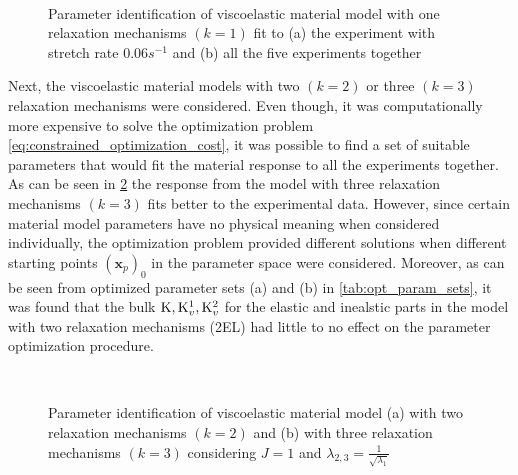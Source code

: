 \begin{figure}[htpb]
    \centering
     \label{fig:parameter_optimization_1EL_pt06} 
     \label{fig:parameter_optimization_1EL_all}\\
    \caption[Parameter identification 1]{Parameter identification of viscoelastic material model with one relaxation mechanisms \((k=1)\) fit to (a) the experiment with stretch rate \(0.06s^{-1}\) and (b) all the five experiments together}
    \label{fig:parameter_optimization_1EL}
\end{figure}

Next, the viscoelastic material models with two \((k=2)\) or three \((k=3)\) relaxation mechanisms were considered. Even though, it was computationally more expensive to solve the optimization problem \cref{eq:constrained_optimization_cost}, it was possible to find a set of suitable parameters that would fit the material response to all the experiments together. As can be seen in \cref{fig:parameter_optimization} the response from the model with three relaxation mechanisms \((k=3)\) fits better to the experimental data. However, since certain material model parameters have no physical meaning when considered individually, the optimization problem provided different solutions when different starting points \((\bm{x}_{p})_{0}\) in the parameter space were considered. Moreover, as can be seen from  optimized parameter sets (a) and (b) in \cref{tab:opt_param_sets}, it was found that the bulk  \(\mathrm{K}{}, \mathrm{K}_{v}^{1}, \mathrm{K}_{v}^{2}\) for the elastic and inealstic parts in the model with two relaxation mechanisms (2EL) had little to no effect on the parameter optimization procedure. 


\begin{figure}[htpb]
    \centering
     \label{fig:parameter_optimization_2EL} 
     \label{fig:parameter_optimization_3EL}\\
    \caption[Parameter identification 2]{Parameter identification of viscoelastic material model (a) with two relaxation mechanisms \((k=2)\) and (b) with three relaxation mechanisms \((k=3)\) considering \(J=1\) and \(\lambda_{2,3} = \frac{1}{\sqrt{\lambda_1}}\)}
    \label{fig:parameter_optimization}
\end{figure}

